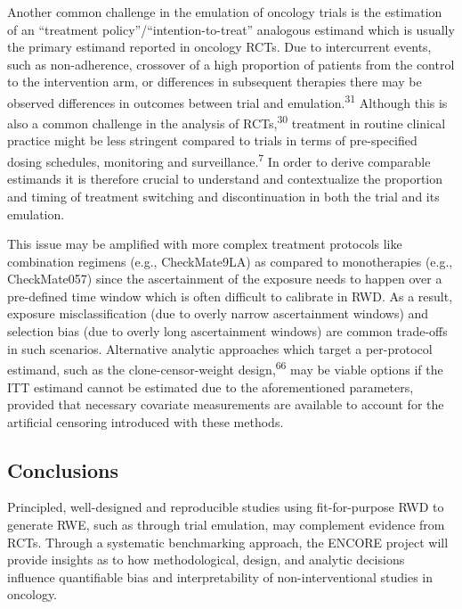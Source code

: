 \documentclass[
  letterpaper,
  DIV=11,
  numbers=noendperiod]{scrartcl}
\begin{document}
Another common challenge in the emulation of oncology trials is the
estimation of an ``treatment policy''/``intention-to-treat'' analogous
estimand which is usually the primary estimand reported in oncology
RCTs. Due to intercurrent events, such as non-adherence, crossover of a
high proportion of patients from the control to the intervention arm, or
differences in subsequent therapies there may be observed differences in
outcomes between trial and emulation.\textsuperscript{31} Although this
is also a common challenge in the analysis of RCTs,\textsuperscript{30}
treatment in routine clinical practice might be less stringent compared
to trials in terms of pre-specified dosing schedules, monitoring and
surveillance.\textsuperscript{7} In order to derive comparable estimands
it is therefore crucial to understand and contextualize the proportion
and timing of treatment switching and discontinuation in both the trial
and its emulation.

This issue may be amplified with more complex treatment protocols like
combination regimens (e.g., CheckMate9LA) as compared to monotherapies
(e.g., CheckMate057) since the ascertainment of the exposure needs to
happen over a pre-defined time window which is often difficult to
calibrate in RWD. As a result, exposure misclassification (due to overly
narrow ascertainment windows) and selection bias (due to overly long
ascertainment windows) are common trade-offs in such scenarios.
Alternative analytic approaches which target a per-protocol estimand,
such as the clone-censor-weight design,\textsuperscript{66} may be
viable options if the ITT estimand cannot be estimated due to the
aforementioned parameters, provided that necessary covariate
measurements are available to account for the artificial censoring
introduced with these methods.

\subsection{Conclusions}\label{conclusions}

Principled, well-designed and reproducible studies using fit-for-purpose
RWD to generate RWE, such as through trial emulation, may complement
evidence from RCTs. Through a systematic benchmarking approach, the
ENCORE project will provide insights as to how methodological, design,
and analytic decisions influence quantifiable bias and interpretability
of non-interventional studies in oncology.

\newpage{}
\end{document}
